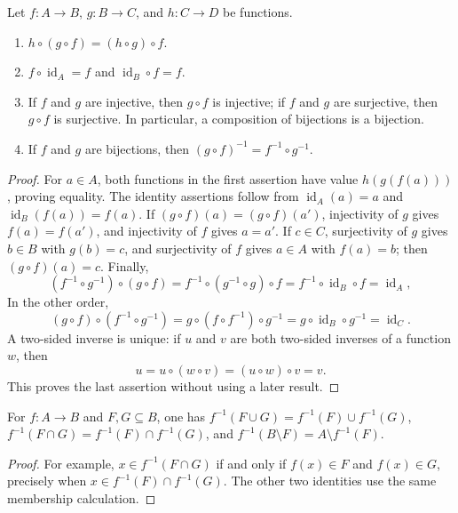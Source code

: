 \begin{proposition}
\label{prop:composition-laws}
Let $f:A\to B$, $g:B\to C$, and $h:C\to D$ be functions.
\begin{enumerate}
\item $h\circ(g\circ f)=(h\circ g)\circ f$.
\item $f\circ\operatorname{id}_A=f$ and $\operatorname{id}_B\circ f=f$.
\item If $f$ and $g$ are injective, then $g\circ f$ is injective; if $f$ and $g$ are surjective, then $g\circ f$ is surjective. In particular, a composition of bijections is a bijection.
\item If $f$ and $g$ are bijections, then $(g\circ f)^{-1}=f^{-1}\circ g^{-1}$.
\end{enumerate}
\end{proposition}
\begin{proof}
For $a\in A$, both functions in the first assertion have value $h(g(f(a)))$, proving equality. The identity assertions follow from $\operatorname{id}_A(a)=a$ and $\operatorname{id}_B(f(a))=f(a)$. If $(g\circ f)(a)=(g\circ f)(a')$, injectivity of $g$ gives $f(a)=f(a')$, and injectivity of $f$ gives $a=a'$. If $c\in C$, surjectivity of $g$ gives $b\in B$ with $g(b)=c$, and surjectivity of $f$ gives $a\in A$ with $f(a)=b$; then $(g\circ f)(a)=c$. Finally,
\[
(f^{-1}\circ g^{-1})\circ(g\circ f)=f^{-1}\circ(g^{-1}\circ g)\circ f
=f^{-1}\circ\operatorname{id}_B\circ f=\operatorname{id}_A,
\]
In the other order,
\[
(g\circ f)\circ(f^{-1}\circ g^{-1})
=g\circ(f\circ f^{-1})\circ g^{-1}
=g\circ\operatorname{id}_B\circ g^{-1}=\operatorname{id}_C.
\] A two-sided inverse is unique: if $u$ and $v$ are both two-sided inverses of a function $w$, then
\[
u=u\circ(w\circ v)=(u\circ w)\circ v=v.
\]
This proves the last assertion without using a later result.
\end{proof}



\begin{proposition}
\label{prop:inverse-image-rules}
For $f:A\to B$ and $F,G\subseteq B$, one has $f^{-1}(F\cup G)=f^{-1}(F)\cup f^{-1}(G)$, $f^{-1}(F\cap G)=f^{-1}(F)\cap f^{-1}(G)$, and $f^{-1}(B\setminus F)=A\setminus f^{-1}(F)$.
\end{proposition}
\begin{proof}
For example, $x\in f^{-1}(F\cap G)$ if and only if $f(x)\in F$ and $f(x)\in G$, precisely when $x\in f^{-1}(F)\cap f^{-1}(G)$. The other two identities use the same membership calculation.
\end{proof}

